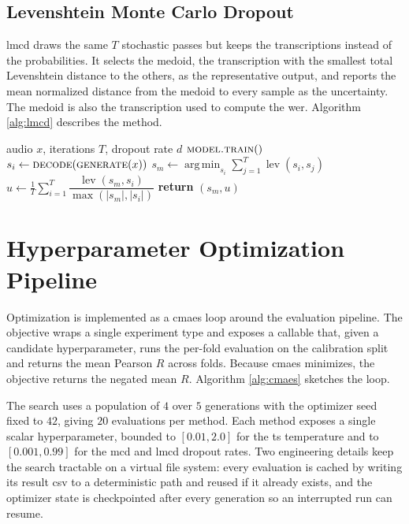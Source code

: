 \subsection{Levenshtein Monte Carlo Dropout}
\acrshort{lmcd} draws the same $T$ stochastic passes but keeps the transcriptions instead of the probabilities. It selects the medoid, the transcription with the smallest total Levenshtein distance to the others, as the representative output, and reports the mean normalized distance from the medoid to every sample as the uncertainty. The medoid is also the transcription used to compute the \acrshort{wer}. Algorithm \ref{alg:lmcd} describes the method.

\begin{algorithm}[ht]
	\caption{Levenshtein Monte Carlo Dropout uncertainty score}
	\label{alg:lmcd}
	\begin{algorithmic}[1]
		\Require audio $x$, iterations $T$, dropout rate $d$
		\State $\textsc{model.train}()$ 
		\State $s_i \gets \textsc{decode}(\textsc{generate}(x))$
		\EndFor
		\State $s_m \gets \operatorname*{arg\,min}_{s_i} \sum_{j=1}^{T} \operatorname{lev}(s_i, s_j)$ 
		\State $u \gets \frac{1}{T}\sum_{i=1}^{T} \dfrac{\operatorname{lev}(s_m, s_i)}{\max(|s_m|, |s_i|)}$
		\State \textbf{return} $(s_m, u)$
	\end{algorithmic}
\end{algorithm}

\section{Hyperparameter Optimization Pipeline}

Optimization is implemented as a \acrshort{cmaes} loop around the evaluation pipeline. The objective wraps a single experiment type and exposes a callable that, given a candidate hyperparameter, runs the per-fold evaluation on the calibration split and returns the mean Pearson $R$ across folds. Because \acrshort{cmaes} minimizes, the objective returns the negated mean $R$. Algorithm \ref{alg:cmaes} sketches the loop.

The search uses a population of $4$ over $5$ generations with the optimizer seed fixed to $42$, giving $20$ evaluations per method. Each method exposes a single scalar hyperparameter, bounded to $[0.01, 2.0]$ for the \acrshort{ts} temperature and to $[0.001, 0.99]$ for the \acrshort{mcd} and \acrshort{lmcd} dropout rates. Two engineering details keep the search tractable on a virtual file system: every evaluation is cached by writing its result \acrshort{csv} to a deterministic path and reused if it already exists, and the optimizer state is checkpointed after every generation so an interrupted run can resume.

